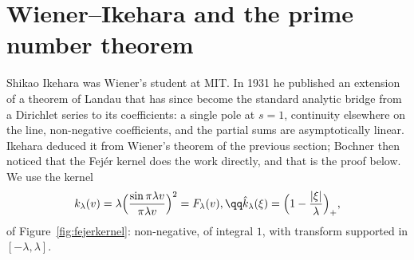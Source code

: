 \section{Wiener--Ikehara and the prime number theorem}

Shikao Ikehara was Wiener's student at MIT. In 1931 he published an extension of a theorem of Landau that has since become the standard analytic bridge
from a Dirichlet series to its coefficients: a single pole at $s=1$, continuity elsewhere on the line, non-negative coefficients, and the partial sums are
asymptotically linear. Ikehara deduced it from Wiener's theorem of the previous section; Bochner then noticed that the Fej\'er kernel does the work
directly, and that is the proof below. We use the kernel
\[
k_\lambda(v)=\lambda\Bigl(\frac{\sin\pi\lambda v}{\pi\lambda v}\Bigr)^2=F_\lambda(v),\qq\hat k_\lambda(\xi)=\Bigl(1-\frac{|\xi|}\lambda\Bigr)_+,
\]
of Figure~\ref{fig:fejerkernel}: non-negative, of integral $1$, with transform supported in $[-\lambda,\lambda]$.

